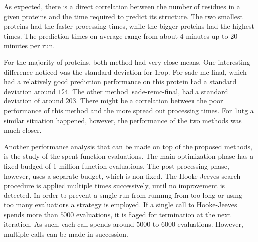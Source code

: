 As expected, there is a direct correlation between the number of residues in a
given proteins and the time required to predict its structure. The two smallest
proteins had the faster processing times, while the bigger proteins had the
highest times. The prediction times on average range from about 4 minutes up to
20 minutes per run.

For the majority of proteins, both method had very close means. One interesting
difference noticed was the standard deviation for 1rop. For sade-mc-final,
which had a relatively good prediction performance on this protein had
a standard deviation around $124$. The other method, sade-remc-final, had a
standard deviation of around $203$. There might be a correlation between the
poor performance of this method and the more spread out processing times.
For 1utg a similar situation happened, however, the performance of the two
methods was much closer.

Another performance analysis that can be made on top of the proposed methods,
is the study of the spent function evaluations. The main optimization phase has
a fixed budged of 1 million function evaluations. The post-processing phase,
however, uses a separate budget, which is non fixed. The Hooke-Jeeves
search procedure is applied multiple times successively, until no improvement
is detected. In order to prevent a single run from running from too long or
using too many evaluations a strategy is employed. If a single call to
Hooke-Jeeves spends more than $5000$ evaluations, it is flaged for termination
at the next iteration. As such, each call spends around $5000$ to $6000$
evaluations. However, multiple calls can be made in succession.

